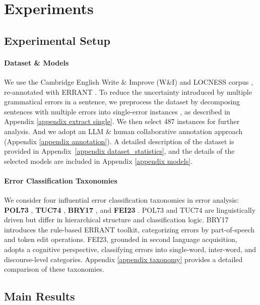 \section{Experiments}
\subsection{Experimental Setup}

\paragraph{Dataset \& Models}
We use the Cambridge English Write \& Improve (W\&I) and LOCNESS corpus \citep{w&i}, re-annotated with ERRANT \citep{errant}. To reduce the uncertainty introduced by multiple grammatical errors in a sentence, we preprocess the dataset by decomposing sentences with multiple errors into single-error instances \citep{enhancing}, as described in Appendix \ref{appendix extract single}. We then select 487 instances for further analysis. And we adopt an LLM \& human collaborative annotation approach (Appendix \ref{appendix annotation}). A detailed description of the dataset is provided in Appendix~\ref{appendix dataset_statistics}, and the details of the selected models are included in Appendix \ref{appendix models}.

\paragraph{Error Classification Taxonomies}
We consider four influential error classification taxonomies in error analysis: \textbf{POL73} \citep{linguistic_one}, \textbf{TUC74} \citep{gooficon}, \textbf{BRY17} \cite{errant}, and \textbf{FEI23} \citep{enhancing}. POL73 and TUC74 are linguistically driven but differ in hierarchical structure and classification logic. BRY17 introduces the rule-based ERRANT toolkit, categorizing errors by part-of-speech and token edit operations. FEI23, grounded in second language acquisition, adopts a cognitive perspective, classifying errors into single-word, inter-word, and discourse-level categories. Appendix \ref{appendix taxonomy} provides a detailed comparison of these taxonomies.




\subsection{Main Results}


